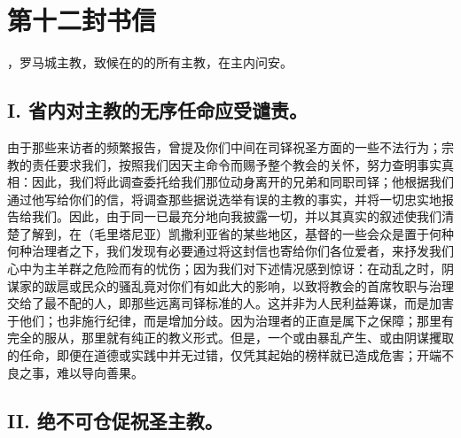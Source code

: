 

\section{第十二封书信}

，罗马城主教，致候在的的所有主教，在主内问安。\par


\subsection{I. 省内对主教的无序任命应受谴责。}

由于那些来访者的频繁报告，曾提及你们中间在司铎祝圣方面的一些不法行为；宗教的责任要求我们，按照我们因天主命令而赐予整个教会的关怀，努力查明事实真相：因此，我们将此调查委托给我们那位动身离开的兄弟和同职司铎；他根据我们通过他写给你们的信，将调查那些据说选举有误的主教的事实，并将一切忠实地报告给我们。因此，由于同一已最充分地向我披露一切，并以其真实的叙述使我们清楚了解到，在（毛里塔尼亚）凯撒利亚省的某些地区，基督的一些会众是置于何种何种治理者之下，我们发现有必要通过将这封信也寄给你们各位爱者，来抒发我们心中为主羊群之危险而有的忧伤；因为我们对下述情况感到惊讶：在动乱之时，阴谋家的跋扈或民众的骚乱竟对你们有如此大的影响，以致将教会的首席牧职与治理交给了最不配的人，即那些远离司铎标准的人。这并非为人民利益筹谋，而是加害于他们；也非施行纪律，而是增加分歧。因为治理者的正直是属下之保障；那里有完全的服从，那里就有纯正的教义形式。但是，一个或由暴乱产生、或由阴谋攫取的任命，即便在道德或实践中并无过错，仅凭其起始的榜样就已造成危害；开端不良之事，难以导向善果。\par


\subsection{II. 绝不可仓促祝圣主教。}

